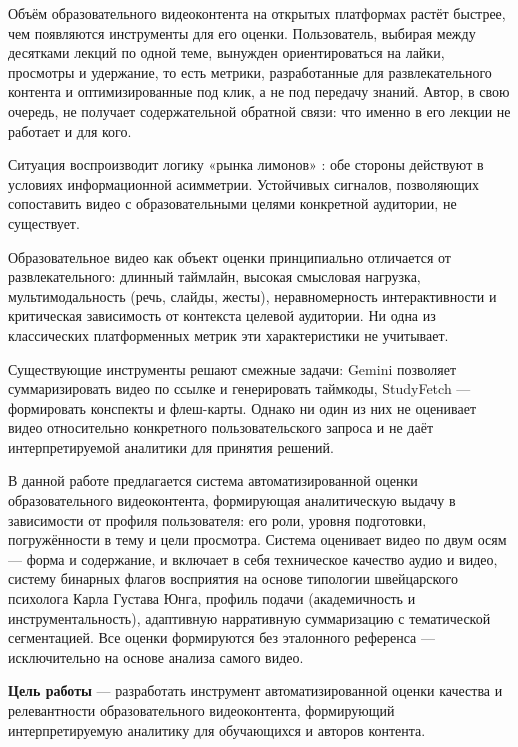 

Объём образовательного видеоконтента на открытых платформах растёт быстрее, чем появляются инструменты для его оценки.
Пользователь, выбирая между десятками лекций по одной теме, вынужден ориентироваться на лайки,
просмотры и удержание, то есть метрики, разработанные для развлекательного контента и оптимизированные под клик, а не под передачу знаний.
Автор, в свою очередь, не получает содержательной обратной связи: что именно в его лекции не работает и для кого.

Ситуация воспроизводит логику «рынка лимонов» \cite{akerlof1970lemons}: обе стороны действуют в условиях информационной асимметрии.
Устойчивых сигналов, позволяющих сопоставить видео с образовательными целями конкретной аудитории, не существует.

Образовательное видео как объект оценки принципиально отличается от развлекательного: длинный таймлайн, высокая смысловая нагрузка, мультимодальность (речь, слайды, жесты),
неравномерность интерактивности и критическая зависимость от контекста целевой аудитории. Ни одна из классических платформенных метрик эти характеристики не учитывает.

Существующие инструменты решают смежные задачи: Gemini позволяет суммаризировать видео по ссылке и генерировать таймкоды, StudyFetch — формировать конспекты и флеш-карты.
Однако ни один из них не оценивает видео относительно конкретного пользовательского запроса и не даёт интерпретируемой аналитики для принятия решений.

В данной работе предлагается система автоматизированной оценки образовательного видеоконтента, формирующая аналитическую выдачу в зависимости от профиля пользователя:
его роли, уровня подготовки, погружённости в тему и цели просмотра. Система оценивает видео по двум осям — форма и содержание, и включает в себя техническое качество аудио и видео,
систему бинарных флагов восприятия на основе типологии швейцарского психолога Карла Густава Юнга, профиль подачи (академичность и инструментальность),
адаптивную нарративную суммаризацию с тематической сегментацией.
Все оценки формируются без эталонного референса — исключительно на основе анализа самого видео.

\textbf{Цель работы} — разработать инструмент автоматизированной оценки качества и релевантности образовательного видеоконтента,
формирующий интерпретируемую аналитику для обучающихся и авторов контента.

\vspace{20pt}

